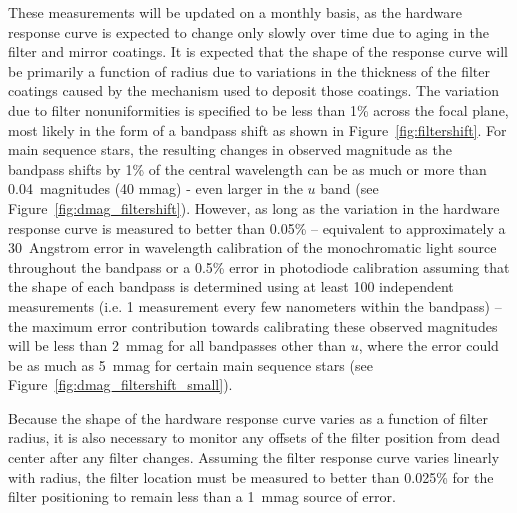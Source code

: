 \documentclass[12pt,preprint]{aastex}
\begin{document}
These measurements will be updated on a monthly basis, as the hardware
response curve is expected to change only slowly over time due to
aging in the filter and mirror coatings. It is expected that the shape
of the response curve will be primarily a function of radius due to
variations in the thickness of the filter coatings caused by the
mechanism used to deposit those coatings. The variation due to filter
nonuniformities is specified to be less than 1\% across the focal
plane, most likely in the form of a bandpass shift as shown in
Figure~\ref{fig:filtershift}. For main sequence stars, the resulting
changes in observed magnitude as the bandpass shifts by 1\% of the
central wavelength can be as much or more than 0.04~magnitudes (40
mmag) - even larger in the $u$ band (see
Figure~\ref{fig:dmag_filtershift}). However, as long as the variation
in the hardware response curve is measured to better than 0.05\% --
equivalent to approximately a 30~Angstrom error in wavelength
calibration of the monochromatic light source throughout the bandpass
or a 0.5\% error in photodiode calibration assuming that the shape of
each bandpass is determined using at least 100 independent
measurements (i.e. 1 measurement every few nanometers within the bandpass) --
the maximum error contribution towards calibrating these observed magnitudes
will be less than 2~mmag for all bandpasses other than $u$, where the
error could be as much as 5~mmag for certain main sequence stars (see
Figure~\ref{fig:dmag_filtershift_small}). 

Because the shape of the hardware response curve varies as a function
of filter radius, it is also necessary to monitor any offsets of the
filter position from dead center after any filter changes. Assuming
the filter response curve varies linearly with radius, the filter
location must be measured to better than 0.025\%  for the filter
positioning to remain less than a 1~mmag source of error. 
\end{document}
